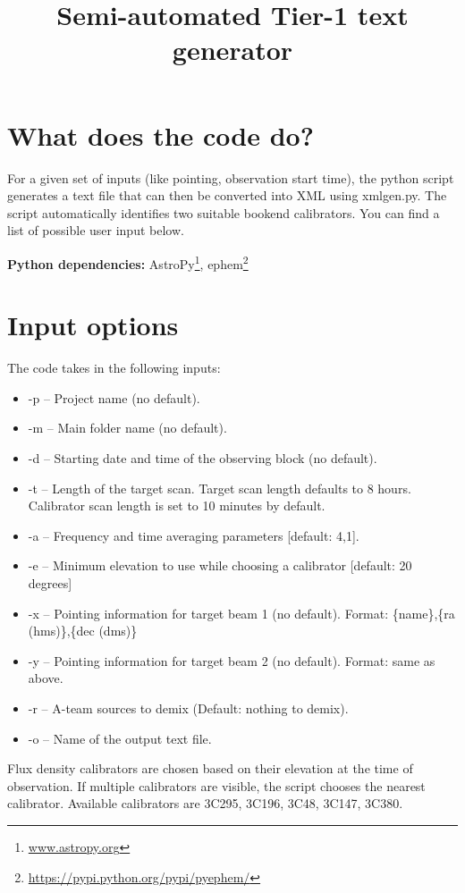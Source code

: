 \documentclass[a4paper,11pt]{article}
\title{Semi-automated Tier-1 text generator}
\begin{document}
\maketitle
\section*{What does the code do?}
For a given set of inputs (like pointing, observation start time), the python script generates a text file that can then be converted into XML using xmlgen.py. The script automatically identifies two suitable bookend calibrators. You can find a list of possible user input below. 

\noindent\textbf{Python dependencies:} AstroPy\footnote{\url{www.astropy.org}}, ephem\footnote{\url{https://pypi.python.org/pypi/pyephem/}}

\section*{Input options}
The code takes in the following inputs:
\begin{itemize}
\item -p -- Project name (no default).
\item -m -- Main folder name (no default).
\item -d -- Starting date and time of the observing block (no default).
\item -t -- Length of the target scan. Target scan length defaults to 8 hours. Calibrator scan length is set to 10 minutes by default.
\item -a -- Frequency and time averaging parameters [default: 4,1].
\item -e -- Minimum elevation to use while choosing a calibrator [default: 20 degrees]
\item -x -- Pointing information for target beam 1 (no default). Format: \{name\},\{ra (hms)\},\{dec (dms)\} 
\item -y -- Pointing information for target beam 2 (no default). Format: same as above.
\item -r -- A-team sources to demix (Default: nothing to demix).
\item -o -- Name of the output text file.
\end{itemize}

Flux density calibrators are chosen based on their elevation at the time of observation. If multiple calibrators are visible, the script chooses the nearest calibrator. Available calibrators are 3C295, 3C196, 3C48, 3C147, 3C380.
\end{document}
